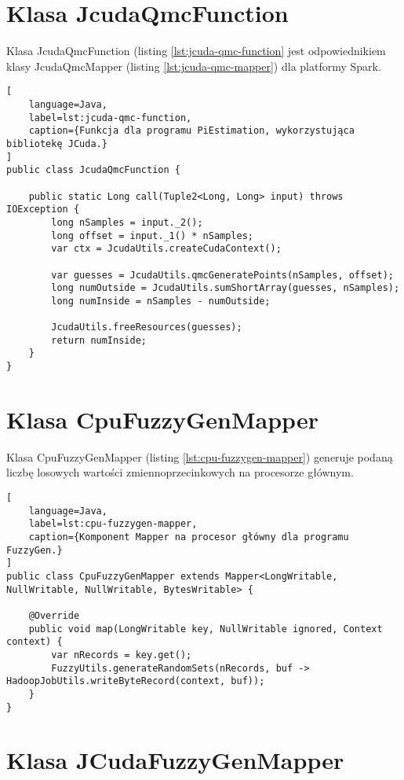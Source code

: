 \section*{Klasa JcudaQmcFunction} \label{ch:jcuda-qmc-function}

Klasa JcudaQmcFunction (listing \ref{lst:jcuda-qmc-function} jest odpowiednikiem klasy JcudaQmcMapper
(listing \ref{lst:jcuda-qmc-mapper}) dla platformy Spark.

\begin{lstlisting}[
    language=Java,
    label=lst:jcuda-qmc-function,
    caption={Funkcja dla programu PiEstimation, wykorzystująca bibliotekę JCuda.}
]
public class JcudaQmcFunction {

    public static Long call(Tuple2<Long, Long> input) throws IOException {
        long nSamples = input._2();
        long offset = input._1() * nSamples;
        var ctx = JcudaUtils.createCudaContext();

        var guesses = JcudaUtils.qmcGeneratePoints(nSamples, offset);
        long numOutside = JcudaUtils.sumShortArray(guesses, nSamples);
        long numInside = nSamples - numOutside;

        JcudaUtils.freeResources(guesses);
        return numInside;
    }
}
\end{lstlisting}
\newpage

\section*{Klasa CpuFuzzyGenMapper} \label{ch:cpu-fuzzygen-mapper}

Klasa CpuFuzzyGenMapper (listing \ref{lst:cpu-fuzzygen-mapper}) generuje podaną liczbę losowych
wartości zmiennoprzecinkowych na procesorze głównym.

\begin{lstlisting}[
    language=Java,
    label=lst:cpu-fuzzygen-mapper,
    caption={Komponent Mapper na procesor główny dla programu FuzzyGen.}
]
public class CpuFuzzyGenMapper extends Mapper<LongWritable, NullWritable, NullWritable, BytesWritable> {

    @Override
    public void map(LongWritable key, NullWritable ignored, Context context) {
        var nRecords = key.get();
        FuzzyUtils.generateRandomSets(nRecords, buf -> HadoopJobUtils.writeByteRecord(context, buf));
    }
}
\end{lstlisting}
\newpage

\section*{Klasa JCudaFuzzyGenMapper} \label{ch:jcuda-fuzzygen-mapper}

